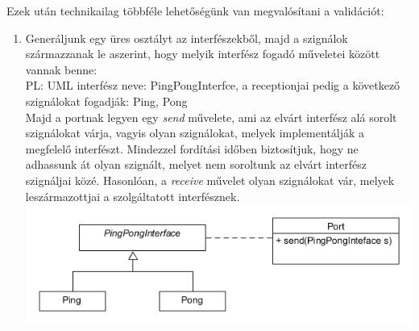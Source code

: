 \documentclass[a4paper,12pt]{report}
\begin{document}
Ezek után technikailag többféle lehetőségünk van megvalósítani a validációt: \\
\begin{enumerate}

\item Generáljunk egy üres osztályt az interfészekből, majd a szignálok származzanak le aszerint, hogy melyik interfész fogadó műveletei között vannak benne: \\
PL: UML interfész neve: PingPongInterfce, a receptionjai pedig a következő szignálokat fogadják: Ping, Pong \\
Majd a portnak legyen egy \textit{send} művelete, ami az elvárt interfész alá sorolt szignálokat várja, vagyis olyan szignálokat, melyek implementálják a megfelelő interfészt.
Mindezzel fordítási időben biztosítjuk, hogy ne adhassunk át olyan szignált, melyet nem soroltunk az elvárt interfész szignáljai közé. Hasonlóan, a \textit{receive} művelet olyan szignálokat vár, melyek leszármazottjai a szolgáltatott interfésznek. \\

\includegraphics[scale=0.7]{inf_ver1.png} \\


\end{enumerate}
\end{document}
